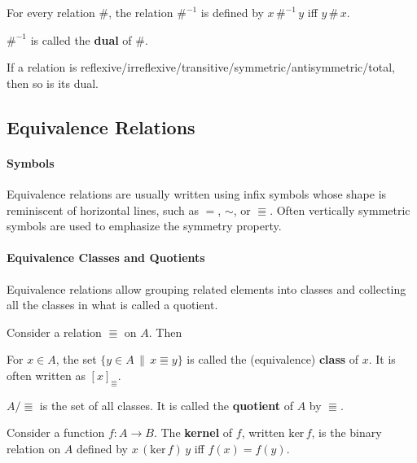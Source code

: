 \begin{definition}
For every relation $\#$, the relation $\#^{-1}$ is defined by $x\,\#^{-1}\, y$ iff $y\,\#\,x$.

$\#^{-1}$ is called the \textbf{dual} of $\#$.
\end{definition}

\begin{theorem}
If a relation is reflexive/irreflexive/transitive/symmetric/antisymmetric/total, then so is its dual.
\end{theorem}

\subsection{Equivalence Relations}

\paragraph{Symbols}
Equivalence relations are usually written using infix symbols whose shape is reminiscent of horizontal lines, such as $=$, $\sim$, or $\Equiv$.
Often vertically symmetric symbols are used to emphasize the symmetry property.

\paragraph{Equivalence Classes and Quotients}
Equivalence relations allow grouping related elements into classes and collecting all the classes in what is called a quotient.

\begin{definition}[Quotient]
Consider a relation $\Equiv$ on $A$.
Then
\begin{compactitem}
 \item For $x\in A$, the set $\{y\in A\,\|\,x\Equiv y\}$ is called the (equivalence) \textbf{class} of $x$.
  It is often written as $[x]_\Equiv$.
 \item $A/\Equiv$ is the set of all classes.
  It is called the \textbf{quotient} of $A$ by $\Equiv$.
\end{compactitem}
\end{definition}

\begin{definition}[Kernel]
Consider a function $f:A\to B$. The \textbf{kernel} of $f$, written $\mathrm{ker}\, f$, is the binary relation on $A$ defined by $x\,(\mathrm{ker}\, f)\,y$ iff $f(x)=f(y)$.
\end{definition}

